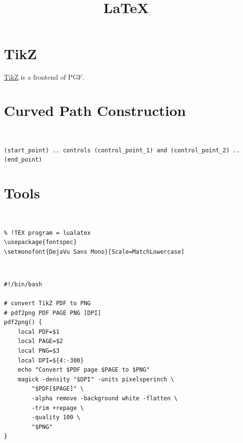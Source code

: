 \documentclass{blog}
\title{LaTeX}
\begin{document}
\maketitle
\tableofcontents

\section{TikZ}
\begin{definition}[TikZ]
    \href{https://tikz.dev/}{TikZ} is a frontend of PGF.
\end{definition}

\section{Curved Path Construction}
\begin{definition}~
    \begin{verbatim}
(start_point) .. controls (control_point_1) and (control_point_2) .. (end_point)
\end{verbatim}
\end{definition}

\begin{LTXexample}[pos=b]
\end{LTXexample}

\appendix
\section{Tools}
\begin{example}~
    \begin{verbatim}
% !TEX program = lualatex
\usepackage{fontspec}
\setmonofont{DejaVu Sans Mono}[Scale=MatchLowercase]
\end{verbatim}
\end{example}

\begin{example}~
    \begin{verbatim}
#!/bin/bash

# convert TikZ PDF to PNG
# pdf2png PDF PAGE PNG [DPI]
pdf2png() {
    local PDF=$1
    local PAGE=$2
    local PNG=$3
    local DPI=${4:-300}
    echo "Convert $PDF page $PAGE to $PNG"
    magick -density "$DPI" -units pixelsperinch \
        "$PDF[$PAGE]" \
        -alpha remove -background white -flatten \
        -trim +repage \
        -quality 100 \
        "$PNG"
}
\end{verbatim}
\end{example}
\end{document}
